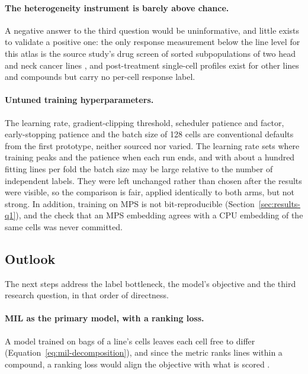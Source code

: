 \paragraph{The heterogeneity instrument is barely above chance.} A negative answer to the third question
would be uninformative, and little exists to validate a positive one: the only response measurement
below the line level for this atlas is the source study's drug screen of sorted subpopulations of two
head and neck cancer lines \cite{scp542}, and post-treatment single-cell profiles exist for other lines
and compounds \cite{srivatsan2020,tahoe100m} but carry no per-cell response label.

\paragraph{Untuned training hyperparameters.} The learning rate, gradient-clipping threshold, scheduler
patience and factor, early-stopping patience and the batch size of 128 cells are conventional defaults
from the first prototype, neither sourced nor varied. The learning
rate sets where training peaks and the patience when each run ends, and with about a hundred fitting lines
per fold the batch size may be large relative to the number of independent labels. They were left
unchanged rather than chosen after the results were visible, so the comparison is fair, applied
identically to both arms, but not strong. In addition, training on MPS is not bit-reproducible
(Section~\ref{sec:results-q1}), and the check that an MPS embedding agrees with a CPU embedding of the
same cells was never committed.

\subsection{Outlook}

The next steps address the label bottleneck, the model's objective and the third research question, in
that order of directness.

\paragraph{MIL as the primary model, with a ranking loss.} A model trained on bags of a line's cells
leaves each cell free to differ (Equation~\ref{eq:mil-decomposition}), and since the metric ranks lines
within a compound, a ranking loss would align the objective with what is scored
\cite{ilse2018,burges2005}.

